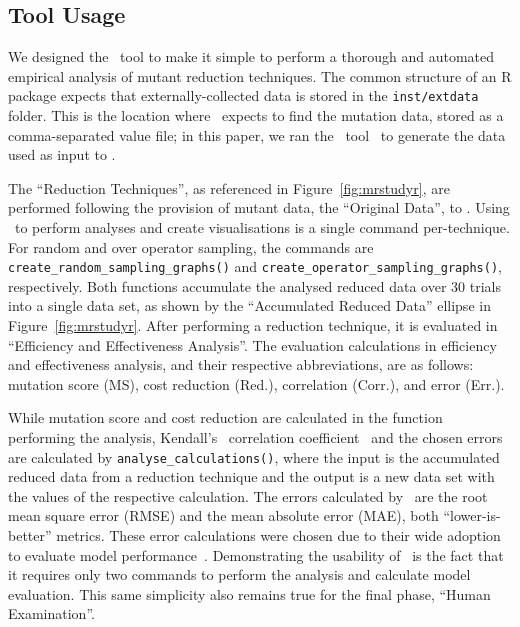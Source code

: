 \subsection{Tool Usage}




We designed the \mr~tool to make it simple to perform a thorough and automated empirical analysis of mutant reduction
techniques. The common structure of an R package expects that externally-collected data is stored in the
\texttt{inst/extdata} folder. This is the location where \mr~expects to find the mutation data, stored as a
comma-separated value file; in this paper, we ran the \sa~tool~\cite{McMinn2016} to generate the data used as input
to \mr.



The ``Reduction Techniques'', as referenced in Figure~\ref{fig:mrstudyr}, are performed following the provision of
mutant data, the ``Original Data'', to \mr. Using \mr~to perform analyses and create visualisations is a single command
per-technique.  For random and over operator sampling, the commands are {\texttt{create\_random\_sampling\_graphs()}}
and {\texttt{create\_operator\_sampling\_graphs()}}, respectively. Both functions accumulate the analysed reduced data
over 30 trials into a single data set, as shown by the ``Accumulated Reduced Data'' ellipse in
Figure~\ref{fig:mrstudyr}. After performing a reduction technique, it is evaluated in ``Efficiency and Effectiveness
Analysis''. The evaluation calculations in efficiency and effectiveness analysis, and their respective abbreviations,
are as follows: mutation score (MS), cost reduction (Red.), correlation (Corr.), and error (Err.).


While mutation score and cost reduction are calculated in the function performing the analysis, Kendall's
\taub~correlation coefficient~\cite{mcminn2016virtual} and the chosen errors are calculated by
\texttt{analyse\_calculations()}, where the input is the accumulated reduced data from a reduction technique
and the output is a new data set with the values of the respective calculation.  The errors calculated by
\mr~are the root mean square error (RMSE) and the mean absolute error (MAE), both ``lower-is-better'' metrics.
These error calculations were chosen due to their wide adoption to evaluate model performance~\cite{chai2014root}.
Demonstrating the usability of \mr~is the fact that it requires only two commands to perform the analysis and
calculate model evaluation. This same simplicity also remains true for the final phase, ``Human Examination''.

